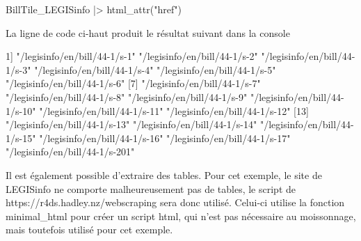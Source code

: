 \documentclass[
  letterpaper,
  DIV=11,
  numbers=noendperiod]{scrreprt}
\newenvironment{Shaded}{\begin{snugshade}}{\end{snugshade}}
\newcommand{\ExtensionTok}[1]{\textcolor[rgb]{0.00,0.23,0.31}{#1}}
\newcommand{\KeywordTok}[1]{\textcolor[rgb]{0.00,0.23,0.31}{#1}}
\newcommand{\NormalTok}[1]{\textcolor[rgb]{0.00,0.23,0.31}{#1}}
\newcommand{\OperatorTok}[1]{\textcolor[rgb]{0.37,0.37,0.37}{#1}}
\newcommand{\StringTok}[1]{\textcolor[rgb]{0.13,0.47,0.30}{#1}}
\begin{document}
\begin{Shaded}
\begin{Highlighting}[]
\ExtensionTok{BillTile\_LEGISinfo} \KeywordTok{|}\OperatorTok{\textgreater{}}\NormalTok{ html\_attr}\KeywordTok{(}\StringTok{"href"}\KeywordTok{)}
\end{Highlighting}
\end{Shaded}

La ligne de code ci-haut produit le résultat suivant dans la console

\begin{Shaded}
\begin{Highlighting}[]
\ExtensionTok{1]} \StringTok{"/legisinfo/en/bill/44{-}1/s{-}1"}  
\StringTok{"/legisinfo/en/bill/44{-}1/s{-}2"} 
\StringTok{"/legisinfo/en/bill/44{-}1/s{-}3"}  
\StringTok{"/legisinfo/en/bill/44{-}1/s{-}4"}  
\StringTok{"/legisinfo/en/bill/44{-}1/s{-}5"}  
\StringTok{"/legisinfo/en/bill/44{-}1/s{-}6"}  
 \ExtensionTok{[7]} \StringTok{"/legisinfo/en/bill/44{-}1/s{-}7"} 
 \StringTok{"/legisinfo/en/bill/44{-}1/s{-}8"}  
 \StringTok{"/legisinfo/en/bill/44{-}1/s{-}9"}  
 \StringTok{"/legisinfo/en/bill/44{-}1/s{-}10"}  
 \StringTok{"/legisinfo/en/bill/44{-}1/s{-}11"} 
 \StringTok{"/legisinfo/en/bill/44{-}1/s{-}12"} 
\ExtensionTok{[13]} \StringTok{"/legisinfo/en/bill/44{-}1/s{-}13"} 
\StringTok{"/legisinfo/en/bill/44{-}1/s{-}14"} 
\StringTok{"/legisinfo/en/bill/44{-}1/s{-}15"}  
\StringTok{"/legisinfo/en/bill/44{-}1/s{-}16"} 
\StringTok{"/legisinfo/en/bill/44{-}1/s{-}17"} 
\StringTok{"/legisinfo/en/bill/44{-}1/s{-}201"}
\end{Highlighting}
\end{Shaded}

Il est également possible d'extraire des tables. Pour cet exemple, le
site de LEGISinfo ne comporte malheureusement pas de tables, le script
de https://r4ds.hadley.nz/webscraping sera donc utilisé. Celui-ci
utilise la fonction minimal\_html pour créer un script html, qui n'est
pas nécessaire au moissonnage, mais toutefois utilisé pour cet exemple.
\end{document}
